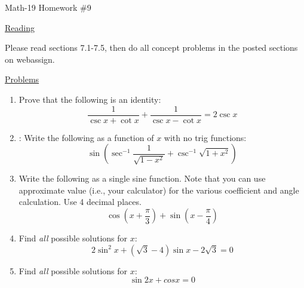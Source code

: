 \documentclass[letterpaper,12pt,fleqn]{article}
\begin{document}
\begin{center}
\Large Math-19 Homework \#9
\end{center}

\vspace{0.5in}

\underline{Reading}

Please read sections 7.1-7.5, then do all concept problems in the posted
sections on web\-assign.

\underline{Problems}

\begin{enumerate}
\item Prove that the following is an identity:
  \[\frac{1}{\csc{x}+\cot{x}}+\frac{1}{\csc{x}-\cot{x}}=2\csc{x}\]

\item: Write the following as a function of $x$ with no trig functions:
  \[\sin\left(\sec^{-1}\frac{1}{\sqrt{1-x^2}}+\csc^{-1}\sqrt{1+x^2}\right)\]

\item Write the following as a single sine function. Note that you can use
  approximate value (i.e., your calculator) for the various coefficient and
  angle calculation. Use 4 decimal places.
  \[\cos\left(x+\frac{\pi}{3}\right)+\sin\left(x-\frac{\pi}{4}\right)\]

\item Find \emph{all} possible solutions for $x$:
  \[2\sin^2x+(\sqrt{3}-4)\sin{x}-2\sqrt{3}=0\]

\item Find \emph{all} possible solutions for $x$:
  \[\sin{2x}+cos{x}=0\]
\end{enumerate}
\end{document}
